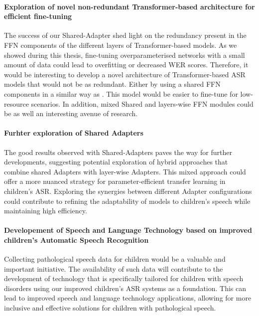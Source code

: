 \paragraph*{Exploration of novel non-redundant Transformer-based architecture for efficient fine-tuning} The success of our Shared-Adapter shed light on the redundancy present in the \ac{FFN} components of the different layers of Transformer-based models. As we showed during this thesis, fine-tuning overparameterised networks with a small amount of data could lead to overfitting or decreased \ac{WER} scores. Therefore, it would be interesting to develop a novel architecture of Transformer-based \ac{ASR} models that would not be as redundant. Either by using a shared \ac{FFN} components in a similar way as \cite{pires2023one}. This model would be easier to fine-tune for low-resource scenarios. In addition, mixed Shared and layers-wise \ac{FFN} modules could be as well an interesting avenue of research.

\paragraph*{Furhter exploration of Shared Adapters} The good results observed with Shared-Adapters paves the way for further developments, suggesting potential exploration of hybrid approaches that combine shared Adapters with layer-wise Adapters. This mixed approach could offer a more nuanced strategy for parameter-efficient transfer learning in children's \ac{ASR}. Exploring the synergies between different Adapter configurations could contribute to refining the adaptability of models to children's speech while maintaining high efficiency.

\paragraph*{Developement of Speech and Language Technology based on improved children's Automatic Speech Recognition} Collecting pathological speech data for children would be a valuable and important initiative. The availability of such data will contribute to the development of technology that is specifically tailored for children with speech disorders using our improved children's \ac{ASR} systems as a foundation. This can lead to improved speech and language technology applications, allowing for more inclusive and effective solutions for children with pathological speech.